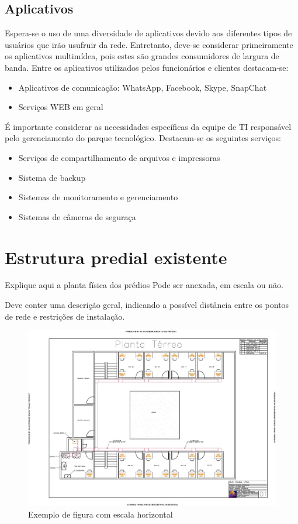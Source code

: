 \documentclass[	DIV=calc,%
							paper=a4,%
							fontsize=12pt,%
							onecolumn]{scrartcl}	 					%
\begin{document}
\subsection{Aplicativos}
Espera-se o uso de uma diversidade de aplicativos devido aos diferentes tipos de usuários que irão usufruir da rede. Entretanto, deve-se considerar primeiramente os aplicativos multimídea, pois estes são grandes consumidores de largura de banda.
Entre os aplicativos utilizados pelos funcionários e clientes destacam-se:
\begin{itemize}
	\item Aplicativos de comunicação: WhatsApp, Facebook, Skype, SnapChat
	\item Serviços WEB em geral
\end{itemize}
É importante considerar as necessidades específicas da equipe de TI responsável pelo gerenciamento do parque tecnológico. Destacam-se os seguintes serviços:
\begin{itemize}
	\item Serviços de compartilhamento de arquivos e impressoras
	\item Sistema de backup 
	\item Sistemas de monitoramento e gerenciamento
	\item Sistemas de câmeras de seguraça
\end{itemize} 


\section{Estrutura predial existente}

Explique aqui a planta física dos prédios
Pode ser anexada, em escala ou não.

Deve conter uma descrição geral, indicando a possível distância entre os pontos de rede e restrições de instalação.


\begin{figure}
\centering
\includegraphics[width=\textwidth]{planta-shop}
\caption{Exemplo de figura com escala horizontal}
\label{rack}
\end{figure}
\end{document}
